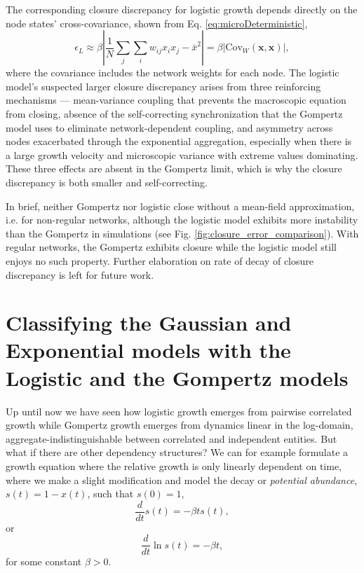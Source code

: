 \documentclass{article}
\begin{document}
The corresponding closure discrepancy for logistic growth depends directly on the node states' cross-covariance, shown from Eq. \ref{eq:microDeterministic}, 
\begin{equation}
  \epsilon_L \approx \beta\left|\frac{1}{N}\sum_j\sum_iw_{ij}x_ix_j - \bar{x}^2\right| = \beta|\text{Cov}_W(\mathbf{x},\mathbf{x})|,
\end{equation}
where the covariance includes the network weights for each node. The logistic model's suspected larger closure discrepancy arises from three reinforcing mechanisms — mean-variance coupling that prevents the macroscopic equation from closing, absence of the self-correcting synchronization that the Gompertz model uses to eliminate network-dependent coupling, and asymmetry across nodes exacerbated through the exponential aggregation, especially when there is a large growth velocity and microscopic variance with extreme values dominating. These three effects are absent in the Gompertz limit, which is why the closure discrepancy is both smaller and self-correcting.

 In brief, neither Gompertz nor logistic close without a mean-field approximation, i.e. for non-regular networks, although the logistic model exhibits more instability than the Gompertz in simulations (see Fig. \ref{fig:closure_error_comparison}). With regular networks, the Gompertz exhibits closure while the logistic model still enjoys no such property. Further elaboration on rate of decay of closure discrepancy is left for future work.

\section{Classifying the Gaussian and Exponential models with the Logistic and the Gompertz models}

Up until now we have seen how logistic growth emerges from pairwise correlated growth while Gompertz growth emerges from dynamics linear in the log-domain, aggregate-indistinguishable between correlated and independent entities. But what if there are other dependency structures? We can for example formulate a growth equation where the relative growth is only linearly dependent on time, where we make a slight modification and model the decay or \textit{potential abundance}, $s(t) = 1 - x(t)$, such that $s(0)=1$,
\begin{equation}
  \frac{d}{dt}s(t) = - \beta t s(t),
\end{equation}
or 
\begin{equation}
  \frac{d}{dt}\ln s(t) = - \beta t,
\end{equation}
for some constant $\beta>0$. 
 
\end{document}
